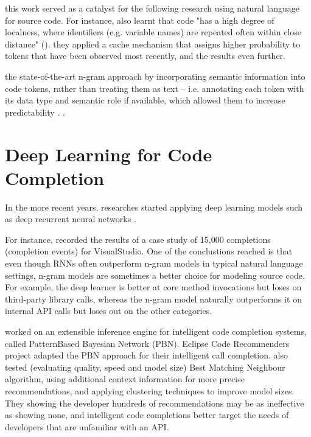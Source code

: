 this work served as a  catalyst for the following research using natural language  for source code. For instance, \cite{Tu14a} also learnt that code "has a high degree of localness, where identifiers (e.g. variable names) are repeated often within close distance" (\cite{Alla18a}). they applied a cache mechanism that assigns higher probability to tokens that have been observed most recently, and   the results even further.

\cite{Nguy13a}  the state-of-the-art n-gram  approach by incorporating semantic information into code tokens, rather than treating them as text -- i.e. annotating each token with its data type and semantic role if available, which allowed them to  increase predictability . . 

\section{Deep Learning for Code Completion}
\label{sec:RelatedWorks-DeepLearning}
In the more recent years, researches started applying deep learning models such as deep recurrent neural networks .

For instance, \cite{Hell19a} recorded the results of a case study of 15,000 completions (completion events) for VisualStudio. One of the conclustions  reached is that even though RNNs often outperform n-gram models in typical natural language settings, n-gram models are sometimes a better choice for modeling source code. For example, the deep learner is better at core method invocations but loses on third-party library calls, whereas the n-gram model naturally outperforms it on internal API calls but loses out on the other categories.

\cite{Prok15a} worked on an extensible inference engine for intelligent code completion systems, called PatternBased Bayesian Network (PBN). Eclipse Code Recommenders project adapted the PBN approach for their intelligent call completion.  also tested (evaluating quality, speed and model size) Best Matching Neighbour algorithm, using additional context information for more precise recommendations, and applying clustering techniques to improve model sizes. They showing the developer hundreds of recommendations may be as ineffective as showing none, and intelligent code completions better target the needs of developers that are unfamiliar with an API.

